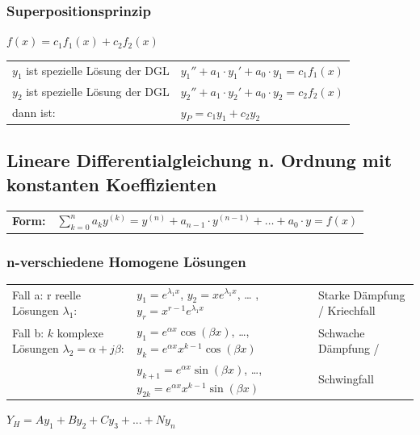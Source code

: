 
\subsubsection{Superpositionsprinzip}
$f(x)=c_1f_1(x)+c_2f_2(x)$\\
\begin{tabular}{p{8cm}p{8cm}}
$y_1$ ist spezielle Lösung der DGL &
$y_1''+a_1\cdot y_1'+a_0\cdot y_1=c_1f_1(x)$ \\
$y_2$ ist spezielle Lösung der DGL &
$y_2''+a_1\cdot y_2'+a_0\cdot y_2=c_2f_2(x)$ \\
dann ist:                          &
$y_P=c_1y_1+c_2y_2$\\
\end{tabular}

\subsection{Lineare Differentialgleichung n. Ordnung mit konstanten Koeffizienten }
	\begin{tabular}{p{1.5cm}p{8cm}}
		\textbf{Form:} &
		$\sum\limits_{k=0}^na_ky^{(k)}= y^{(n)}+a_{n-1}\cdot y^{(n-1)}+\ldots +a_0\cdot y=f(x)$\\
	\end{tabular}

\subsubsection{n-verschiedene Homogene Lösungen}
	\begin{tabular}{lll}
		Fall a: r reelle Lösungen $\lambda_1$: 
			& $y_1=e^{\lambda_1x}$, $y_2=xe^{\lambda_1x}$, \ldots
			,$y_r=x^{r-1}e^{\lambda_1x}$ 
			& Starke Dämpfung / Kriechfall\\
		Fall b: $k$ komplexe Lösungen $\lambda_2=\alpha +j\beta$: 
			&$y_1=e^{\alpha x}\cos(\beta x)$, \ldots, $y_k=e^{\alpha x}x^{k-1}\cos(\beta
		x)$
			& Schwache Dämpfung /\\
			&$y_{k+1}=e^{\alpha x}\sin(\beta x)$, \ldots, $y_{2k}=e^{\alpha
		x}x^{k-1}\sin(\beta x)$
			& Schwingfall\\
	\end{tabular}
	$Y_H = Ay_1 + By_2 + Cy_3 + ... + Ny_n$

